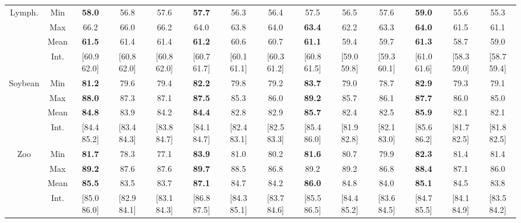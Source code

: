 \documentclass[10pt]{article}
\begin{document}
\begin{Table}
{\begin{tabular}{|c|c|ccc|ccc|ccc|ccc|}
\\
\cline{1-14}
\multirow{4}{1.6cm}{Lymph.}
&Min
 &{\bfseries 58.0} &56.8 &57.6  %
 &{\bfseries 57.7} &56.3 &56.4  %
 &57.5 &56.5 &57.6  %
 &{\bfseries 59.0} &55.6 &55.3  %
\\
&Max
 &66.2 &66.0 &66.2  %
 &64.0 &63.8 &64.0  %
 &{\bfseries 63.4} &62.2 &63.3  %
 &{\bfseries 64.0} &61.5 &61.1  %
\\
&Mean
 &{\bfseries 61.5} &61.4 &61.4  %
 &{\bfseries 61.2} &60.6 &60.7  %
 &{\bfseries 61.1} &59.4 &59.7  %
 &{\bfseries 61.3} &58.7 &59.0  %
\\
&Int.
 &[60.9 62.0] &[60.8 62.0] &[60.8 62.0]  %
 &[60.7 61.7] &[60.1 61.1] &[60.3 61.2]  %
 &[60.8 61.5] &[59.0 59.8] &[59.3 60.1]  %
 &[61.0 61.6] &[58.3 59.0] &[58.7 59.4]  %
\\
\cline{1-14}
\multirow{4}{1.6cm}{Soybean}
&Min
 &{\bfseries 81.2} &79.6 &79.4  %
 &{\bfseries 82.2} &79.8 &79.2  %
 &{\bfseries 83.7} &79.0 &78.7  %
 &{\bfseries 82.9} &79.3 &79.1  %
\\
&Max
 &{\bfseries 88.0} &87.3 &87.1  %
 &{\bfseries 87.5} &85.3 &86.0  %
 &{\bfseries 89.2} &85.7 &86.1  %
 &{\bfseries 87.7} &86.0 &85.0  %
\\
&Mean
 &{\bfseries 84.8} &83.9 &84.2  %
 &{\bfseries 84.4} &82.8 &82.9  %
 &{\bfseries 85.7} &82.4 &82.5  %
 &{\bfseries 85.9} &82.1 &82.1  %
\\
&Int.
 &[84.4 85.2] &[83.4 84.3] &[83.8 84.7]  %
 &[84.1 84.7] &[82.4 83.1] &[82.5 83.3]  %
 &[85.4 86.0] &[81.9 82.8] &[82.1 83.0]  %
 &[85.6 86.2] &[81.7 82.5] &[81.8 82.5]  %
\\
\cline{1-14}
\multirow{4}{1.6cm}{Zoo}
&Min
 &{\bfseries 81.7} &78.3 &77.1  %
 &{\bfseries 83.9} &81.0 &80.2  %
 &{\bfseries 81.6} &80.7 &79.9  %
 &{\bfseries 82.3} &81.4 &81.4  %
\\
&Max
 &{\bfseries 89.2} &87.6 &87.6  %
 &{\bfseries 89.7} &88.5 &86.8  %
 &89.2 &89.2 &86.8  %
 &{\bfseries 88.4} &87.1 &86.0  %
\\
&Mean
 &{\bfseries 85.5} &83.5 &83.7  %
 &{\bfseries 87.1} &84.7 &84.2  %
 &{\bfseries 86.0} &84.8 &84.0  %
 &{\bfseries 85.1} &84.5 &83.8  %
\\
&Int.
 &[85.0 86.0] &[82.9 84.1] &[83.1 84.3]  %
 &[86.8 87.5] &[84.3 85.1] &[83.7 84.6]  %
 &[85.5 86.5] &[84.4 85.2] &[83.6 84.5]  %
 &[84.7 85.5] &[84.1 84.9] &[83.5 84.2]  %
\\
\cline{1-14}
\hline
\end{tabular}
}
\end{Table}
\end{document}
